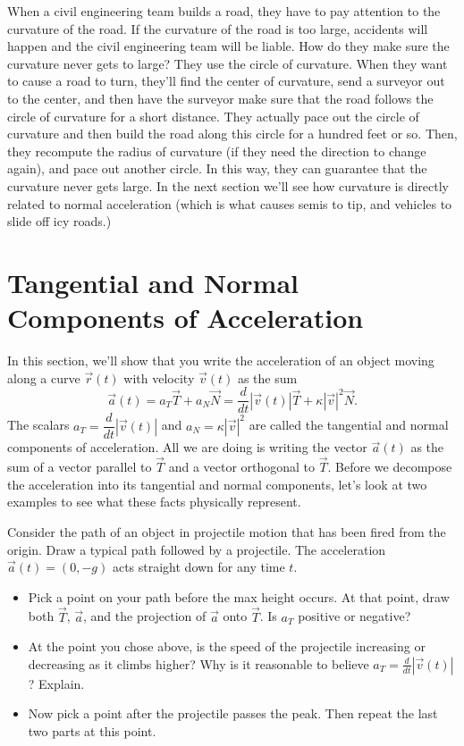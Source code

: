 When a civil engineering team builds a road, they have to pay attention to the curvature of the road.  If the curvature of the road is too large, accidents will happen and the civil engineering team will be liable. How do they make sure the curvature never gets to large?  They use the circle of curvature. When they want to cause a road to turn, they'll find the center of curvature, send a surveyor out to the center, and then have the surveyor make sure that the road follows the circle of curvature for a short distance. They actually pace out the circle of curvature and then build the road along this circle for a hundred feet or so.  Then, they recompute the radius of curvature (if they need the direction to change again), and pace out another circle.  In this way, they can guarantee that the curvature never gets large. In the next section we'll see how curvature is directly related to normal acceleration (which is what causes semis to tip, and vehicles to slide off icy roads.)

\section{Tangential and Normal Components of Acceleration}

In this section, we'll show that you write the acceleration of an object moving along a curve $\vec r(t)$ with velocity $\vec v(t)$ as the sum
$$\vec a(t) = a_T\vec T+a_N\vec N=\frac{d}{dt}|\vec v(t)| \vec T + \kappa |\vec v|^2 \vec N.$$
The scalars $a_T=\dfrac{d}{dt}|\vec v(t)|$ and $a_N=\kappa |\vec v|^2$ 
are called the tangential and normal components of acceleration.  All we are doing is writing the vector $\vec a(t)$ as the sum of a vector parallel to $\vec T$ and a vector orthogonal to $\vec T$. Before we decompose the acceleration into its tangential and normal components, let's look at two examples to see what these facts physically represent.

\begin{problem}
%
 Consider the path of an object in projectile motion that has been fired from the origin. Draw a typical path followed by a projectile.  The acceleration $\vec a(t)=(0,-g)$ acts straight down for any time $t$.  
\begin{itemize}
 \item Pick a point on your path before the max height occurs. At that point, draw both $\vec T$, $\vec a$, and the projection of $\vec a$ onto $\vec T$.  Is $a_T$ positive or negative? 
 \item At the point you chose above, is the speed of the projectile increasing or decreasing as it climbs higher? Why is it reasonable to believe $a_T = \frac{d}{dt}|\vec v(t)|$? Explain.
 \item Now pick a point after the projectile passes the peak.  Then repeat the last two parts at this point.
\end{itemize}
\end{problem}

